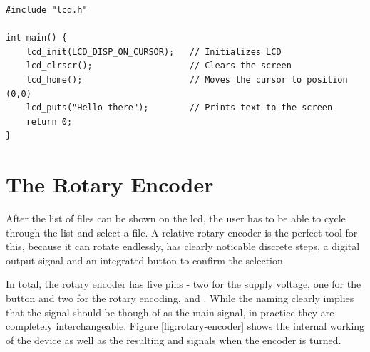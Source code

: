 \begin{lstlisting}[caption=LCD Library, label=lst:lcdlibrary]
#include "lcd.h"

int main() {
    lcd_init(LCD_DISP_ON_CURSOR);   // Initializes LCD
    lcd_clrscr();                   // Clears the screen
    lcd_home();                     // Moves the cursor to position (0,0)
    lcd_puts("Hello there");        // Prints text to the screen
    return 0;
}
\end{lstlisting}

\section{The Rotary Encoder}

After the list of files can be shown on the \gls{lcd}, the user has to be able to cycle through the list and select a file. A relative rotary encoder is the perfect tool for this, because it can rotate endlessly, has clearly noticable discrete steps, a digital output signal and an integrated button to confirm the selection.

In total, the rotary encoder has five pins - two for the supply voltage, one for the button and two for the rotary encoding,  and . While the naming clearly implies that the  signal should be though of as the main signal, in practice they are completely interchangeable. Figure \ref{fig:rotary-encoder} shows the internal working of the device as well as the resulting  and  signals when the encoder is turned.


